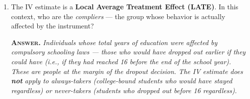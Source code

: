 \documentclass[11pt]{article}
\newcommand{\ans}[1]{%
  \vspace{2pt}%
  {\color{BrickRed}\textsc{\textbf{Answer.}}} {\itshape #1}\par\vspace{4pt}%
}
\begin{document}
\begin{enumerate}
\item The IV estimate is a \textbf{Local Average Treatment Effect (LATE)}. In this context, who are the \textit{compliers} --- the group whose behavior is actually affected by the instrument?

\ans{Individuals whose total years of education were affected by compulsory schooling laws --- those who \textit{would have dropped out earlier} if they could have (i.e., if they had reached 16 before the end of the school year). These are people at the margin of the dropout decision. The IV estimate does \textbf{not} apply to always-takers (college-bound students who would have stayed regardless) or never-takers (students who dropped out before 16 regardless).}

\end{enumerate}
\end{document}
